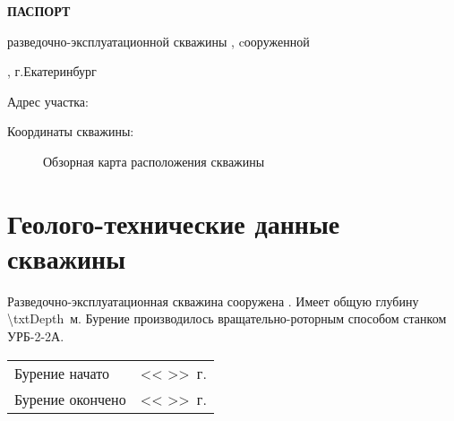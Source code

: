 
	\begin{center}
		\textbf{ПАСПОРТ}

		разведочно-эксплуатационной скважины \txtNumber, cооруженной 

		\txtExecutor, г.Екатеринбург

	\end{center}


	\bigskip
	
	Адрес участка: 

	\underline{\txtAddress}

	\bigskip


	Координаты скважины: \txtCoords
	

	\begin{figure}[h]
		\centering
		\caption{Обзорная карта расположения скважины}
	\end{figure}

    \section{Геолого-технические данные скважины}

    Разведочно-эксплуатационная скважина сооружена \txtExecutor. Имеет общую глубину \num{\txtDepth} \,м.   Бурение производилось вращательно-роторным способом станком УРБ-2-2А.

    \bigskip


	\begin{tabular}{@{}ll}
	Бурение начато & << \underline{\hspace{0.7cm}} >> \underline{\hspace{3cm}} \txtYear \,г.\\
	Бурение окончено & << \underline{\hspace{0.7cm}} >> \underline{\hspace{3cm}} \txtYear \,г.\\
	\end{tabular}
	
